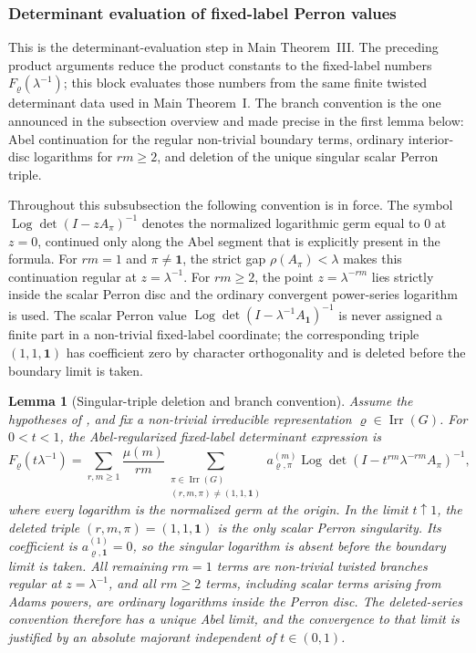 \documentclass[11pt,a4paper]{amsart}
\theoremstyle{plain}
\newtheorem{lemma}[theorem]{Lemma}
\theoremstyle{definition}
\theoremstyle{remark}
\DeclareMathOperator{\Irr}{Irr}
\DeclareMathOperator{\Log}{Log}
\begin{document}
\subsubsection{Determinant evaluation of fixed-label Perron values}
\label{subsubsec:determinant-only-fixed-label-values}

This is the determinant-evaluation step in Main Theorem~III.  The preceding
product arguments reduce the product constants to the fixed-label numbers
\(F_\varrho(\lambda^{-1})\); this block evaluates those numbers from the same
finite twisted determinant data used in Main Theorem~I.  The branch convention
is the one announced in the subsection overview and made precise in the first
lemma below: Abel continuation for the regular non-trivial boundary terms,
ordinary interior-disc logarithms for \(rm\ge2\), and deletion of the unique
singular scalar Perron triple.

Throughout this subsubsection the following convention is in force.  The
symbol \(\Log\det(I-zA_\pi)^{-1}\) denotes the normalized logarithmic germ
equal to \(0\) at \(z=0\), continued only along the Abel segment that is
explicitly present in the formula.  For \(rm=1\) and \(\pi\ne\mathbf1\), the
strict gap \(\rho(A_\pi)<\lambda\) makes this continuation regular at
\(z=\lambda^{-1}\).  For \(rm\ge2\), the point
\(z=\lambda^{-rm}\) lies strictly inside the scalar Perron disc and the
ordinary convergent power-series logarithm is used.  The scalar Perron value
\(\Log\det(I-\lambda^{-1}A_{\mathbf1})^{-1}\) is never assigned a finite part
in a non-trivial fixed-label coordinate; the corresponding triple
\((1,1,\mathbf1)\) has coefficient zero by character orthogonality and is
deleted before the boundary limit is taken.

\begin{lemma}[Singular-triple deletion and branch convention]
  \label{lem:fixed-label-singular-triple-deletion}
  Assume the hypotheses of , and fix a
  non-trivial irreducible representation \(\varrho\in\Irr(G)\).  For
  \(0<t<1\), the Abel-regularized fixed-label determinant expression is
  \begin{equation}\label{eq:fixed-label-singular-deletion-abel}
    F_\varrho(t\lambda^{-1})
    =
    \sum_{r,m\ge1}\frac{\mu(m)}{rm}
      \sum_{\substack{\pi\in\Irr(G)\\(r,m,\pi)\neq(1,1,\mathbf1)}}
        a_{\varrho,\pi}^{(m)}
        \Log\det(I-t^{rm}\lambda^{-rm}A_\pi)^{-1},
  \end{equation}
  where every logarithm is the normalized germ at the origin.  In the limit
  \(t\uparrow1\), the deleted triple \((r,m,\pi)=(1,1,\mathbf1)\) is the
  only scalar Perron singularity. Its coefficient is
  \(a_{\varrho,\mathbf1}^{(1)}=0\), so the singular logarithm is absent
  before the boundary limit is taken.  All remaining \(rm=1\) terms are
  non-trivial twisted branches regular at \(z=\lambda^{-1}\), and all
  \(rm\ge2\) terms, including scalar terms arising from Adams powers, are
  ordinary logarithms inside the Perron disc.  The deleted-series convention
  therefore has a unique Abel limit, and the convergence to that limit is
  justified by an absolute majorant independent of \(t\in(0,1)\).
\end{lemma}
\end{document}
